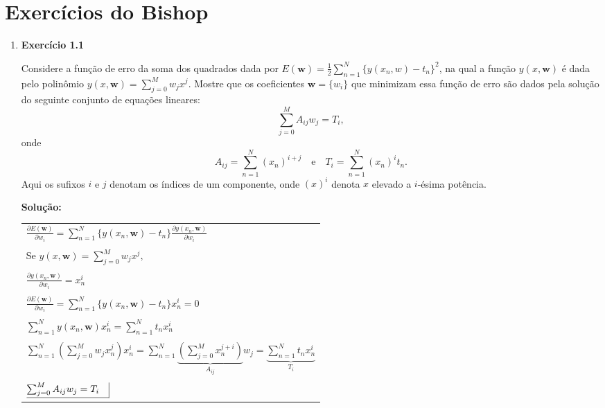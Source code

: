 \section*{Exercícios do Bishop}

\begin{enumerate}


\item \textbf{Exercício 1.1} \par

Considere a função de erro da soma dos quadrados dada por $E(\boldsymbol{w})=\frac{1}{2}\sum_{n=1}^{N} \{y(x_n,w)-t_n\}^2$, na qual a função $y(x,\boldsymbol{w})$ é dada pelo polinômio $y(x,\boldsymbol{w})=\sum_{j=0}^{M} w_jx^j$. Mostre que os coeficientes $\boldsymbol{w} = \{w_i\}$ que minimizam essa função de erro são dados pela solução do seguinte conjunto de equações lineares:
\begin{equation*}
    \sum_{j=0}^{M}A_{ij} w_j = T_i, 
\end{equation*}
onde 
\begin{equation*}
    A_{ij} = \sum_{n=1}^{N} (x_n)^{i+j} \quad \text{e} \quad T_i=\sum_{n=1}^{N} (x_n)^i t_n.
\end{equation*}
Aqui os sufixos $i$ e $j$ denotam os índices de um componente, onde $(x)^i$ denota $x$ elevado a $i$-ésima potência.
\newline \par
\textbf{Solução:}

\begin{tabular}{l}
\\
$\frac{\partial E(\boldsymbol{w})}{\partial w_i} = \sum_{n=1}^{N} \{y(x_n, \boldsymbol{w}) - t_n\} \frac{\partial y(x_n, \boldsymbol{w})}{\partial w_i}$ \\
\\
Se $y(x,\boldsymbol{w})=\sum_{j=0}^{M} w_j x^j,$ \\
\\
$\frac{\partial y(x_n, \boldsymbol{w})}{\partial w_i} = x_n^i $\\
\\
$ \frac{\partial E(\boldsymbol{w})}{\partial w_i} = \sum_{n=1}^{N} \{y(x_n, \boldsymbol{w}) - t_n\} x_n^i = 0 $\\
\\
$\sum_{n=1}^{N} y(x_n, \boldsymbol{w})x_n^i = \sum_{n=1}^{N} t_n x_n^i$\\
\\
$\sum_{n=1}^{N} \left( \sum_{j=0}^{M} w_j x_n^j \right) x_n^i = \sum_{n=1}^{N} \underbrace{\left( \sum_{j=0}^{M} x_n^{j+i} \right)}_{A_{ij}} w_j = \underbrace{\sum_{n=1}^{N} t_n x_n^i}_{T_i}$\\
\\
$ \underline{\sum_{j=0}^{M}A_{ij} w_j = T_i\quad} \vline $\\
\end{tabular}



\end{enumerate}
